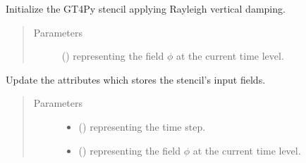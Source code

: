 \documentclass[letterpaper,10pt,english]{sphinxmanual}
\begin{document}
\begin{fulllineitems}
\begin{fulllineitems}
\begin{quote}
\begin{description}
\end{description}\end{quote}

\end{fulllineitems}


\begin{fulllineitems}
\label{\detokenize{api:dycore.vertical_damping.VerticalDampingRayleigh._stencil_initialize}}
Initialize the GT4Py stencil applying Rayleigh vertical damping.
\begin{quote}\begin{description}
\item[{Parameters}] \leavevmode
{} () \textendash{}  representing the field \(\phi\) at the current time level.

\end{description}\end{quote}

\end{fulllineitems}


\begin{fulllineitems}
\label{\detokenize{api:dycore.vertical_damping.VerticalDampingRayleigh._stencil_set_inputs}}
Update the attributes which stores the stencil’s input fields.
\begin{quote}\begin{description}
\item[{Parameters}] \leavevmode\begin{itemize}
\item {} 
 () \textendash{}  representing the time step.

\item {} 
 () \textendash{}  representing the field \(\phi\) at the current time level.


\end{itemize}
\end{description}
\end{quote}
\end{fulllineitems}
\end{fulllineitems}
\end{document}
